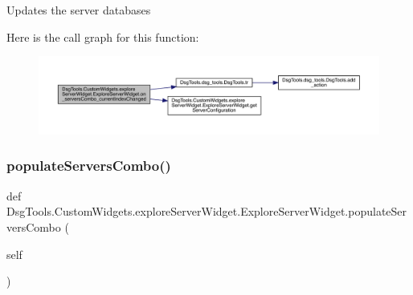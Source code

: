 \begin{DoxyVerb}Updates the server databases
\end{DoxyVerb}
 Here is the call graph for this function\+:
\nopagebreak
\begin{figure}[H]
\begin{center}
\leavevmode
\includegraphics[width=350pt]{class_dsg_tools_1_1_custom_widgets_1_1explore_server_widget_1_1_explore_server_widget_a186c7521aad3ac166a08d958abecb623_cgraph}
\end{center}
\end{figure}
\mbox{\label{class_dsg_tools_1_1_custom_widgets_1_1explore_server_widget_1_1_explore_server_widget_a0f623e6eb0c758c98e1868f770f13eaf}} 
\subsubsection{\texorpdfstring{populate\+Servers\+Combo()}{populateServersCombo()}}
{\footnotesize\ttfamily def Dsg\+Tools.\+Custom\+Widgets.\+explore\+Server\+Widget.\+Explore\+Server\+Widget.\+populate\+Servers\+Combo (\begin{DoxyParamCaption}\item[{}]{self }\end{DoxyParamCaption})}

